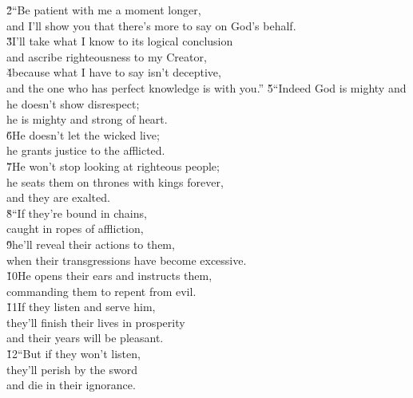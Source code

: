 \begin{poetry}
\poeml \v{2}``Be patient with me a moment longer, \\
\poemll    and I'll show you that there's more to say on God's behalf. \\
\poeml \v{3}I'll take what I know to its logical conclusion \\
\poemll    and ascribe righteousness to my Creator, \\
\poeml \v{4}because what I have to say isn't deceptive, \\
\poemll    and the one who has perfect knowledge is with you.''
\poeml \v{5}``Indeed God is mighty and he doesn't show disrespect; \\
\poemll    he is mighty and strong of heart. \\
\poeml \v{6}He doesn't let the wicked live; \\
\poemll    he grants justice to the afflicted. \\
\poeml \v{7}He won't stop looking at righteous people; \\
\poemll    he seats them on thrones with kings forever, \\
\poemlll       and they are exalted. \\
\poeml \v{8}``If they're bound in chains, \\
\poemll    caught in ropes of affliction, \\
\poeml \v{9}he'll reveal their actions to them, \\
\poemll    when their transgressions have become excessive. \\
\poeml \v{10}He opens their ears and instructs them, \\
\poemll    commanding them to repent from evil. \\
\poeml \v{11}If they listen and serve him, \\
\poemll    they'll finish their lives in prosperity \\
\poemlll       and their years will be pleasant. \\
\poeml \v{12}``But if they won't listen, \\
\poemll    they'll perish by the sword \\
\poemlll       and die in their ignorance. \\

\end{poetry}
